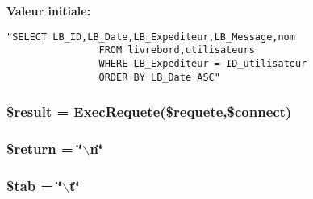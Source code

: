 {\bf Valeur initiale:}

\footnotesize\begin{verbatim}"SELECT LB_ID,LB_Date,LB_Expediteur,LB_Message,nom
                FROM livrebord,utilisateurs
                WHERE LB_Expediteur = ID_utilisateur
                ORDER BY LB_Date ASC"
\end{verbatim}\normalsize 
\hypertarget{archive__create_8php_a7}{
\subsubsection[\$result]{\setlength{\rightskip}{0pt plus 5cm}\$result = Exec\-Requete(\$requete,\$connect)}}
\label{archive__create_8php_a7}


\hypertarget{archive__create_8php_a4}{
\subsubsection[\$return]{\setlength{\rightskip}{0pt plus 5cm}\$return = \char`\"{}$\backslash$n\char`\"{}}}
\label{archive__create_8php_a4}


\hypertarget{archive__create_8php_a3}{
\subsubsection[\$tab]{\setlength{\rightskip}{0pt plus 5cm}\$tab = \char`\"{}$\backslash$t\char`\"{}}}
\label{archive__create_8php_a3}


